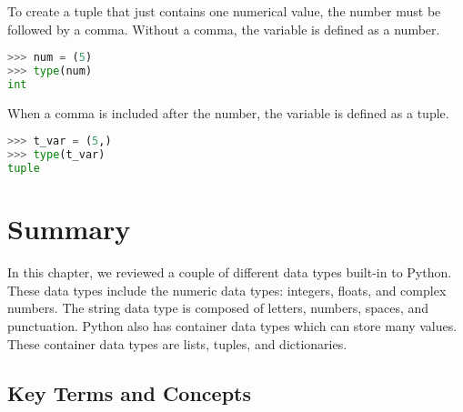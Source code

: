 \documentclass{book}
\begin{document}
To create a tuple that just contains one numerical value, the number
must be followed by a comma. Without a comma, the variable is defined as
a number.

\begin{lstlisting}[language=Python]
>>> num = (5)
>>> type(num)
int
\end{lstlisting}

When a comma is included after the number, the variable is defined as a
tuple.

\begin{lstlisting}[language=Python]
>>> t_var = (5,)
>>> type(t_var)
tuple
\end{lstlisting}
    




    
        \newpage
        \hypertarget{summary}{%
\section{Summary}\label{summary}}

    




    
        In this chapter, we reviewed a couple of different data types built-in
to Python. These data types include the numeric data types: integers,
floats, and complex numbers. The string data type is composed of
letters, numbers, spaces, and punctuation. Python also has container
data types which can store many values. These container data types are
lists, tuples, and dictionaries.
    




    
        \hypertarget{key-terms-and-concepts}{%
\subsection{Key Terms and Concepts}\label{key-terms-and-concepts}}
    
\end{document}
